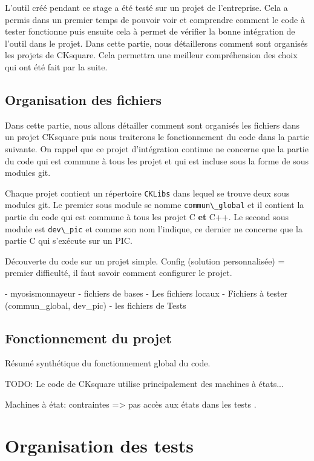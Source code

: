 \documentclass[a4paper]{article}
\begin{document}
L'outil créé pendant ce stage a été testé sur un projet de l'entreprise. Cela a
permis dans un premier temps de pouvoir voir et comprendre comment le code à
tester fonctionne puis ensuite cela à permet de vérifier la bonne intégration de
l'outil dans le projet. Dans cette partie, nous détaillerons comment sont
organisés les projets de CKsquare. Cela permettra une meilleur compréhension des
choix qui ont été fait par la suite.

\subsection{Organisation des fichiers}

Dans cette partie, nous allons détailler comment sont organisés les fichiers
dans un projet CKsquare puis nous traiterons le fonctionnement du code dans la
partie suivante. On rappel que ce projet d'intégration continue ne concerne que
la partie du code qui est commune à tous les projet et qui est incluse sous la
forme de sous modules git.

Chaque projet contient un répertoire \lstinline{CKLibs} dans lequel se trouve
deux sous modules git. Le premier sous module se nomme \lstinline{commun\_global}
et il contient la partie du code qui est commune à tous les projet C \textbf{et}
C++. Le second sous module est \lstinline{dev\_pic} et comme son nom l'indique,
ce dernier ne concerne que la partie C qui s'exécute sur un PIC.

Découverte du code sur un projet simple.
Config (solution personnalisée) = premier difficulté, il faut savoir comment
configurer le projet.

- myosismonnayeur
- fichiers de bases
  - Les fichiers locaux
  - Fichiers à tester (commun\_global, dev\_pic)
- les fichiers de Tests

\subsection{Fonctionnement du projet}

Résumé synthétique du fonctionnement global du code.

TODO: Le code de CKsquare utilise principalement des machines à états...

Machines à état: contraintes => pas accès aux états dans les tests
\cite{teststatemachines}.

\section{Organisation des tests}
\end{document}
